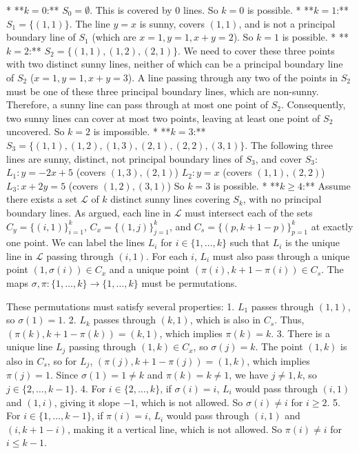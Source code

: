 *   **$k=0$:** $S_0 = \emptyset$. This is covered by 0 lines. So $k=0$ is possible.
*   **$k=1$:** $S_1 = \{(1,1)\}$. The line $y=x$ is sunny, covers $(1,1)$, and is not a principal boundary line of $S_1$ (which are $x=1, y=1, x+y=2$). So $k=1$ is possible.
*   **$k=2$:** $S_2 = \{(1,1), (1,2), (2,1)\}$. We need to cover these three points with two distinct sunny lines, neither of which can be a principal boundary line of $S_2$ ($x=1, y=1, x+y=3$). A line passing through any two of the points in $S_2$ must be one of these three principal boundary lines, which are non-sunny. Therefore, a sunny line can pass through at most one point of $S_2$. Consequently, two sunny lines can cover at most two points, leaving at least one point of $S_2$ uncovered. So $k=2$ is impossible.
*   **$k=3$:** $S_3 = \{(1,1), (1,2), (1,3), (2,1), (2,2), (3,1)\}$. The following three lines are sunny, distinct, not principal boundary lines of $S_3$, and cover $S_3$:
    $L_1: y = -2x+5$ (covers $(1,3), (2,1)$)
    $L_2: y = x$ (covers $(1,1), (2,2)$)
    $L_3: x+2y=5$ (covers $(1,2), (3,1)$)
    So $k=3$ is possible.
*   **$k \ge 4$:** Assume there exists a set $\mathcal{L}$ of $k$ distinct sunny lines covering $S_k$, with no principal boundary lines. As argued, each line in $\mathcal{L}$ must intersect each of the sets $C_y=\{(i,1)\}_{i=1}^k$, $C_x=\{(1,j)\}_{j=1}^k$, and $C_s=\{(p,k+1-p)\}_{p=1}^k$ at exactly one point.
    We can label the lines $L_i$ for $i \in \{1, \dots, k\}$ such that $L_i$ is the unique line in $\mathcal{L}$ passing through $(i,1)$. For each $i$, $L_i$ must also pass through a unique point $(1, \sigma(i)) \in C_x$ and a unique point $(\pi(i), k+1-\pi(i)) \in C_s$. The maps $\sigma, \pi: \{1, \dots, k\} \to \{1, \dots, k\}$ must be permutations.

    These permutations must satisfy several properties:
    1.  $L_1$ passes through $(1,1)$, so $\sigma(1)=1$.
    2.  $L_k$ passes through $(k,1)$, which is also in $C_s$. Thus, $(\pi(k), k+1-\pi(k))=(k,1)$, which implies $\pi(k)=k$.
    3.  There is a unique line $L_j$ passing through $(1,k) \in C_x$, so $\sigma(j)=k$. The point $(1,k)$ is also in $C_s$, so for $L_j$, $(\pi(j), k+1-\pi(j))=(1,k)$, which implies $\pi(j)=1$. Since $\sigma(1)=1 \ne k$ and $\pi(k)=k \ne 1$, we have $j \ne 1,k$, so $j \in \{2, \dots, k-1\}$.
    4.  For $i \in \{2, \dots, k\}$, if $\sigma(i)=i$, $L_i$ would pass through $(i,1)$ and $(1,i)$, giving it slope $-1$, which is not allowed. So $\sigma(i) \ne i$ for $i \ge 2$.
    5.  For $i \in \{1, \dots, k-1\}$, if $\pi(i)=i$, $L_i$ would pass through $(i,1)$ and $(i, k+1-i)$, making it a vertical line, which is not allowed. So $\pi(i) \ne i$ for $i \le k-1$.

